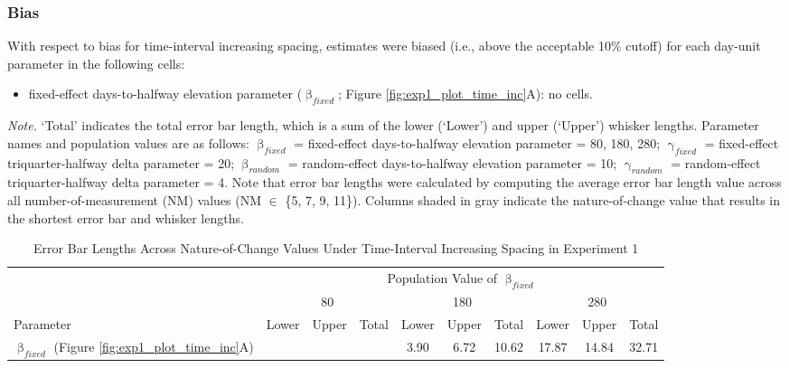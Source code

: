 \documentclass[
12pt, %
twoside,
english]{guelphthesis}
\begin{document}
\hypertarget{bias-time-inc-exp1}{%
\subsubsection{Bias}\label{bias-time-inc-exp1}}

With respect to bias for time-interval increasing spacing, estimates were biased (i.e., above the acceptable 10\% cutoff) for each day-unit parameter in the following cells:
\begin{itemize}
\tightlist
\item
  fixed-effect days-to-halfway elevation parameter (\(\upbeta_{fixed}\); Figure \ref{fig:exp1_plot_time_inc}A): no cells.
\end{itemize}
\begin{ThreePartTable}
\begin{TableNotes}
\item \textit{Note. }`Total' indicates the total error bar length, which is a sum of the lower (`Lower') and upper (`Upper') whisker lengths. Parameter names and population values are as follows: $\upbeta_{fixed}$ = fixed-effect days-to-halfway elevation parameter = {80, 180, 280}; $\upgamma_{fixed}$ = fixed-effect triquarter-halfway delta parameter = 20; $\upbeta_{random}$ = random-effect days-to-halfway elevation parameter = 10; $\upgamma_{random}$ = random-effect triquarter-halfway delta parameter = 4. Note that error bar lengths were calculated by computing the average error bar length value across all number-of-measurement (NM) values (NM $\in$ \{5, 7, 9, 11\}). Columns shaded in gray indicate the nature-of-change value that results in the shortest error bar and whisker lengths.
\end{TableNotes}
\begin{longtable}[l]{>{\raggedright\arraybackslash}p{3cm}>{}c>{}c>{}ccccccc}
\caption{\label{tab:errorbar-time-inc-nc}Error Bar Lengths Across Nature-of-Change Values Under Time-Interval Increasing Spacing in Experiment 1}\\
\toprule
\multicolumn{1}{c}{ } & \multicolumn{9}{c}{Population Value of $\upbeta_{fixed}$} \\
\cmidrule(l{3pt}r{3pt}){2-10}
\multicolumn{1}{c}{ } & \multicolumn{3}{c}{80} & \multicolumn{3}{c}{180} & \multicolumn{3}{c}{280} \\
\cmidrule(l{3pt}r{3pt}){2-4} \cmidrule(l{3pt}r{3pt}){5-7} \cmidrule(l{3pt}r{3pt}){8-10}
Parameter & Lower & Upper & Total & Lower & Upper & Total & Lower & Upper & Total\\
\midrule
\thead[lt]{$\upbeta_{fixed}$ \\ (Figure \ref{fig:exp1_plot_time_inc}A)} & \cellcolor[HTML]{DFDEDE}{3.04} & \cellcolor[HTML]{DFDEDE}{2.76} & \cellcolor[HTML]{DFDEDE}{5.80} & 3.90 & 6.72 & 10.62 & 17.87 & 14.84 & 32.71\\

\end{longtable}
\end{ThreePartTable}
\end{document}
